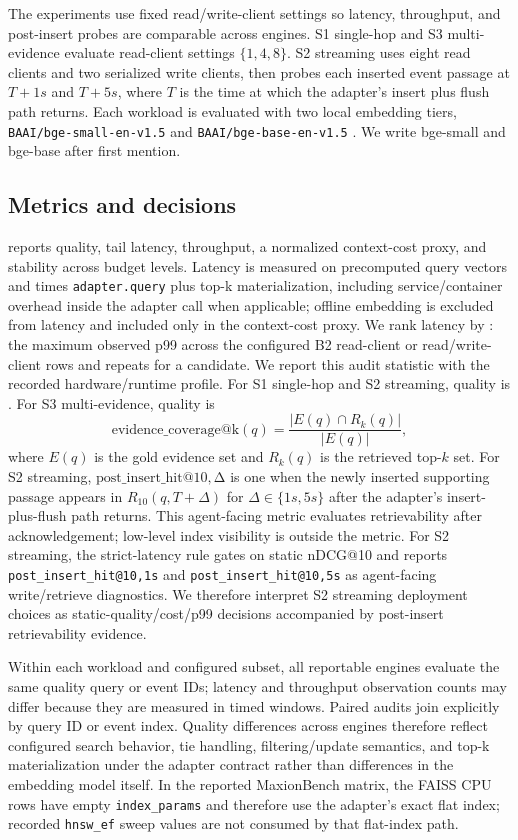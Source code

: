The experiments use fixed read/write-client settings so latency, throughput, and post-insert probes are comparable across engines. S1 single-hop and S3 multi-evidence evaluate read-client settings $\{1,4,8\}$. S2 streaming uses eight read clients and two serialized write clients, then probes each inserted event passage at $T+1s$ and $T+5s$, where $T$ is the time at which the adapter's insert plus flush path returns. Each workload is evaluated with two local embedding tiers, \texttt{BAAI/bge-small-en-v1.5} and \texttt{BAAI/bge-base-en-v1.5} \citep{bge}. We write bge-small and bge-base after first mention.

\subsection{Metrics and decisions}

\sys reports quality, tail latency, throughput, a normalized context-cost proxy, and stability across budget levels. Latency is measured on precomputed query vectors and times \texttt{adapter.query} plus top-k materialization, including service/container overhead inside the adapter call when applicable; offline embedding is excluded from latency and included only in the context-cost proxy. We rank latency by \maxrowp: the maximum observed p99 across the configured B2 read-client or read/write-client rows and repeats for a candidate. We report this audit statistic with the recorded hardware/runtime profile. For S1 single-hop and S2 streaming, quality is \ndcg. For S3 multi-evidence, quality is
\[
\mathrm{evidence\_coverage@k}(q)=\frac{|E(q)\cap R_k(q)|}{|E(q)|},
\]
where $E(q)$ is the gold evidence set and $R_k(q)$ is the retrieved top-$k$ set. For S2 streaming, \(\mathrm{post\_insert\_hit@10,\Delta}\) is one when the newly inserted supporting passage appears in $R_{10}(q,T+\Delta)$ for $\Delta\in\{1s,5s\}$ after the adapter's insert-plus-flush path returns. This agent-facing metric evaluates retrievability after acknowledgement; low-level index visibility is outside the metric. For S2 streaming, the strict-latency rule gates on static nDCG@10 and reports \texttt{post\_insert\_hit@10,1s} and \texttt{post\_insert\_hit@10,5s} as agent-facing write/retrieve diagnostics. We therefore interpret S2 streaming deployment choices as static-quality/cost/p99 decisions accompanied by post-insert retrievability evidence.

Within each workload and configured subset, all reportable engines evaluate the same quality query or event IDs; latency and throughput observation counts may differ because they are measured in timed windows. Paired audits join explicitly by query ID or event index. Quality differences across engines therefore reflect configured search behavior, tie handling, filtering/update semantics, and top-k materialization under the adapter contract rather than differences in the embedding model itself. In the reported MaxionBench matrix, the FAISS CPU rows have empty \texttt{index\_params} and therefore use the adapter's exact flat index; recorded \texttt{hnsw\_ef} sweep values are not consumed by that flat-index path.

